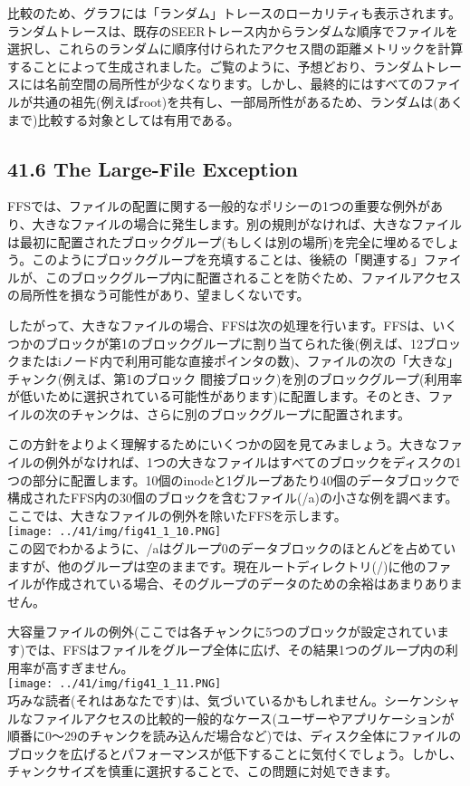 比較のため、グラフには「ランダム」トレースのローカリティも表示されます。ランダムトレースは、既存のSEERトレース内からランダムな順序でファイルを選択し、これらのランダムに順序付けられたアクセス間の距離メトリックを計算することによって生成されました。ご覧のように、予想どおり、ランダムトレースには名前空間の局所性が少なくなります。しかし、最終的にはすべてのファイルが共通の祖先(例えばroot)を共有し、一部局所性があるため、ランダムは(あくまで)比較する対象としては有用である。

\hypertarget{the-large-file-exception}{%
\subsection*{41.6 The Large-File
Exception}\label{the-large-file-exception}}

FFSでは、ファイルの配置に関する一般的なポリシーの1つの重要な例外があり、大きなファイルの場合に発生します。別の規則がなければ、大きなファイルは最初に配置されたブロックグループ(もしくは別の場所)を完全に埋めるでしょう。このようにブロックグループを充填することは、後続の「関連する」ファイルが、このブロックグループ内に配置されることを防ぐため、ファイルアクセスの局所性を損なう可能性があり、望ましくないです。

したがって、大きなファイルの場合、FFSは次の処理を行います。FFSは、いくつかのブロックが第1のブロックグループに割り当てられた後(例えば、12ブロックまたはiノード内で利用可能な直接ポインタの数)、ファイルの次の「大きな」チャンク(例えば、第1のブロック
間接ブロック)を別のブロックグループ(利用率が低いために選択されている可能性があります)に配置します。そのとき、ファイルの次のチャンクは、さらに別のブロックグループに配置されます。

この方針をよりよく理解するためにいくつかの図を見てみましょう。大きなファイルの例外がなければ、1つの大きなファイルはすべてのブロックをディスクの1つの部分に配置します。10個のinodeと1グループあたり40個のデータブロックで構成されたFFS内の30個のブロックを含むファイル(/a)の小さな例を調べます。ここでは、大きなファイルの例外を除いたFFSを示します。\\
\texttt{[image: ../41/img/fig41\_1\_10.PNG]}\\
この図でわかるように、/aはグループ0のデータブロックのほとんどを占めていますが、他のグループは空のままです。現在ルートディレクトリ(/)に他のファイルが作成されている場合、そのグループのデータのための余裕はあまりありません。

大容量ファイルの例外(ここでは各チャンクに5つのブロックが設定されています)では、FFSはファイルをグループ全体に広げ、その結果1つのグループ内の利用率が高すぎません。\\
\texttt{[image: ../41/img/fig41\_1\_11.PNG]}\\
巧みな読者(それはあなたです)は、気づいているかもしれません。シーケンシャルなファイルアクセスの比較的一般的なケース(ユーザーやアプリケーションが順番に0〜29のチャンクを読み込んだ場合など)では、ディスク全体にファイルのブロックを広げるとパフォーマンスが低下することに気付くでしょう。しかし、チャンクサイズを慎重に選択することで、この問題に対処できます。

